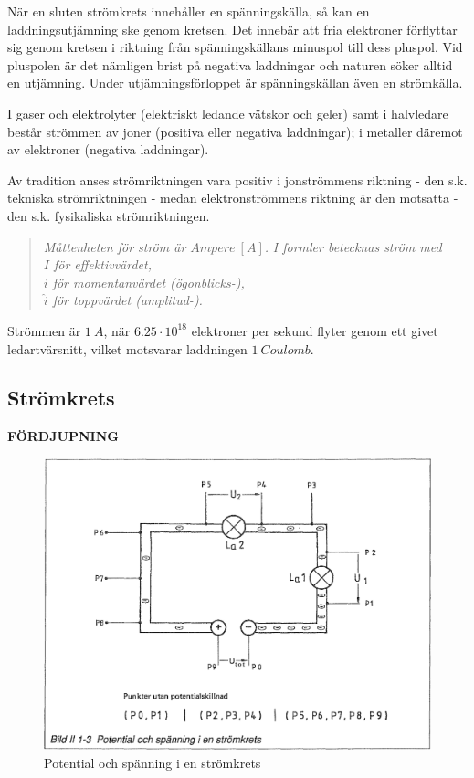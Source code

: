 När en sluten strömkrets innehåller en spänningskälla, så kan en
laddningsutjämning ske genom kretsen. Det innebär att fria elektroner
förflyttar sig genom kretsen i riktning från spänningskällans minuspol till
dess pluspol. Vid pluspolen är det nämligen brist på negativa laddningar och
naturen söker alltid en utjämning. Under utjämningsförloppet är spänningskällan
även en strömkälla.

I gaser och elektrolyter (elektriskt ledande vätskor och geler) samt i
halvledare består strömmen av joner (positiva eller negativa laddningar);
i metaller däremot av elektroner (negativa laddningar).

Av tradition anses strömriktningen vara positiv i jonströmmens riktning - den
s.k. tekniska strömriktningen - medan elektronströmmens riktning är den
motsatta - den s.k. fysikaliska strömriktningen.

\begin{quote}
\emph{Måttenheten för ström är \(Ampere\ [A]\).}
\emph{I formler betecknas ström med} \\
\emph{\(I\) för effektivvärdet,} \\
\emph{\(i\) för momentanvärdet (ögonblicks-),} \\
\emph{\(\hat{i}\) för toppvärdet (amplitud-).}
\end{quote}

Strömmen är \(1\ A\), när \(6.25 \cdot 10^{18}\) elektroner per sekund flyter genom ett givet
ledartvärsnitt, vilket motsvarar laddningen \(1\ Coulomb\).

\subsection{Strömkrets}
\textbf{FÖRDJUPNING}

\begin{figure}
\begin{center}
\includegraphics[width=\textwidth]{images/bild_2_1-03}
\caption{Potential och spänning i en strömkrets}
\label{fig:BildII1-3}
\end{center}
\end{figure}

